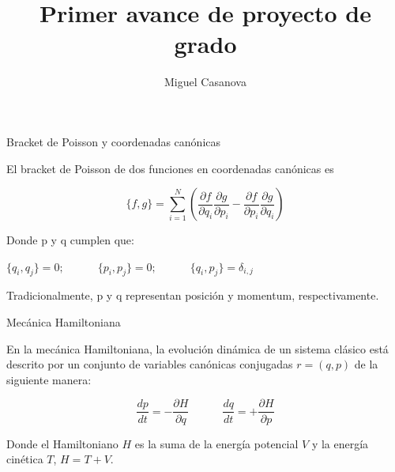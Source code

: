 \documentclass[spanish]{beamer}
\begin{document}
\title{Primer avance de proyecto de grado}
\author{Miguel Casanova}
\maketitle

\begin{frame}{Bracket de Poisson y coordenadas canónicas}
\protect\hypertarget{bracket-de-poisson-y-coordenadas-canuxf3nicas}{}

El bracket de Poisson de dos funciones en coordenadas canónicas es

\[\{f,g\} = \sum\limits_{i=1}^N (\frac{\partial f}{\partial q_i}
 \frac{\partial g}{\partial p_i} - \frac{\partial f}{\partial p_i}
 \frac{\partial g}{\partial q_i})\]

Donde p y q cumplen que:

\(\{q_i,q_j\}=0; \qquad \quad \{p_i,p_j\}=0; \qquad \quad  \{q_i,p_j\}=\delta_{i,j}\)

Tradicionalmente, p y q representan posición y momentum,
respectivamente.

\end{frame}

\begin{frame}{Mecánica Hamiltoniana}
\protect\hypertarget{mecuxe1nica-hamiltoniana}{}

En la mecánica Hamiltoniana, la evolución dinámica de un sistema clásico
está descrito por un conjunto de variables canónicas conjugadas
\(r=(q,p)\) de la siguiente manera:

\[\frac{dp}{dt}=-\frac{\partial H}{\partial q} \qquad \quad 
 \frac{dq}{dt}=+\frac{\partial H}{\partial p}\]

Donde el Hamiltoniano \(H\) es la suma de la energía potencial \(V\) y
la energía cinética \(T\), \(H=T+V\).

\end{frame}
\end{document}
